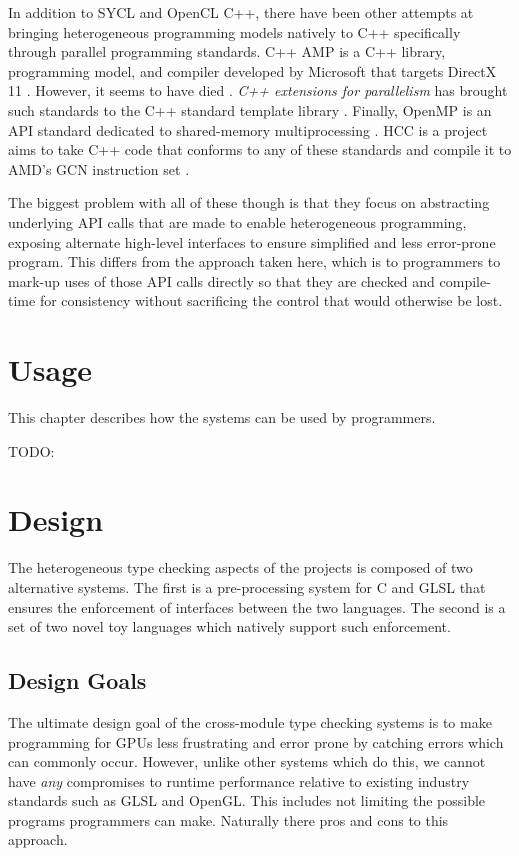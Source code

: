 \documentclass[a4paper,12pt,twoside,openright]{report}
\begin{document}
In addition to SYCL and OpenCL C++, there have been other attempts at bringing
heterogeneous programming models natively to C++ specifically through parallel
programming standards. C++ AMP is a C++ library, programming model, and
compiler developed by Microsoft that targets DirectX 11 \cite{CAMP}. However,
it seems to have died \cite{CAMPFail1} \cite{CAMPFail2}. \textit{C++ extensions
for parallelism} has brought such standards to the C++ standard template
library \cite{CPPParallelism}. Finally, OpenMP is an API standard dedicated to
shared-memory multiprocessing \cite{OpenMP}. HCC is a project aims to take C++
code that conforms to any of these standards and compile it to AMD's GCN
instruction set \cite{HCC}.

The biggest problem with all of these though is that they focus on abstracting
underlying API calls that are made to enable heterogeneous programming,
exposing alternate high-level interfaces to ensure simplified and less
error-prone program. This differs from the approach taken here, which is to
programmers to mark-up uses of those API calls directly so that they are
checked and compile-time for consistency without sacrificing the control that
would otherwise be lost.

\chapter{Usage}

This chapter describes how the systems can be used by programmers.

TODO:

\chapter{Design}

The heterogeneous type checking aspects of the projects is composed of two
alternative systems. The first is a pre-processing system for C and GLSL that
ensures the enforcement of interfaces between the two languages. The second is
a set of two novel toy languages which natively support such enforcement.

\section{Design Goals}

The ultimate design goal of the cross-module type checking systems is to make
programming for GPUs less frustrating and error prone by catching errors which
can commonly occur. However, unlike other systems which do this, we cannot have
\textit{any} compromises to runtime performance relative to existing industry
standards such as GLSL and OpenGL. This includes not limiting the possible
programs programmers can make. Naturally there pros and cons to this approach.
\end{document}
